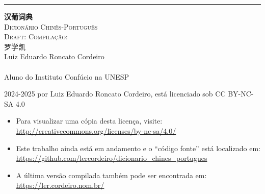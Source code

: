 
\begin{titlingpage}
  \raggedleft
  \rule{1pt}{\textheight}
  \hspace{0.1\textwidth}
  \parbox[b]{0.75\textwidth}{
    \vspace{0.05\textheight}
    {\HUGE\bfseries 汉葡词典}\\[2\baselineskip]%
    {\LARGE\textsc{Dicionário Chinês-Português}\\%
     \ifdraftdoc
     \large\textsc{Draft: \zhtoday \zhcurrtime}%
     \else
     \large\textsc{Compilação: \zhtoday}%
     \fi
    }\\[4\baselineskip]
    {\Large\textsc{罗学凯}\\%
     \small Luiz Eduardo Roncato Cordeiro}\\%
    \vspace{0.5\textheight}\\%
    {Aluno do Instituto Confúcio na UNESP}\\[\baselineskip]%
  }
  \newpage
  \raggedright
  \mbox{}
  \vfill
  \footnotesize
  \textcopyright{} 2024-2025 por Luiz Eduardo Roncato Cordeiro, está licenciado sob CC BY-NC-SA 4.0\\
  \begin{itemize}
    \item Para visualizar uma cópia desta licença, visite:\\ \url{http://creativecommons.org/licenses/by-nc-sa/4.0/}
    \item Este trabalho ainda está em andamento e o ``código fonte'' está localizado em:\\ \url{https://github.com/lercordeiro/dicionario_chines_portugues}
    \item A última versão compilada também pode ser encontrada em:\\ \url{https://ler.cordeiro.nom.br/}
  \end{itemize}
\end{titlingpage}

